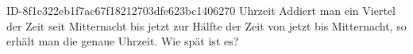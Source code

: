 \begin{exercise}
      {ID-8f1c322eb1f7ac67f18212703dfe623bc1406270}
      {Uhrzeit}
  \ifproblem\problem
    Addiert man ein Viertel der Zeit seit Mitternacht bis jetzt zur Hälfte der
    Zeit von jetzt bis Mitternacht, so erhält man die genaue Uhrzeit.
    Wie spät ist es?
  \fi
\end{exercise}

